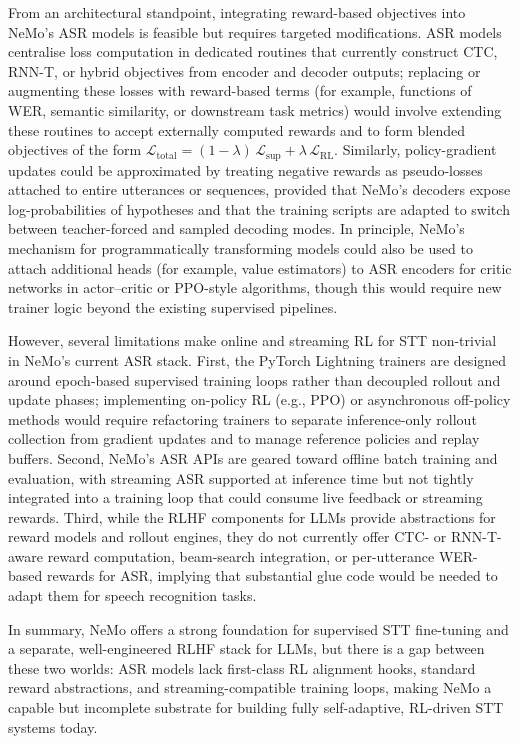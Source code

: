 \documentclass[conference]{IEEEtran}
\begin{document}
From an architectural standpoint, integrating reward-based objectives into NeMo’s ASR models is feasible but requires targeted modifications.
ASR models centralise loss computation in dedicated routines that currently construct CTC, RNN-T, or hybrid objectives from encoder and decoder outputs; replacing or augmenting these losses with reward-based terms (for example, functions of WER, semantic similarity, or downstream task metrics) would involve extending these routines to accept externally computed rewards and to form blended objectives of the form \(\mathcal{L}_{\text{total}} = (1 - \lambda)\,\mathcal{L}_{\text{sup}} + \lambda\,\mathcal{L}_{\text{RL}}\).
Similarly, policy-gradient updates could be approximated by treating negative rewards as pseudo-losses attached to entire utterances or sequences, provided that NeMo’s decoders expose log-probabilities of hypotheses and that the training scripts are adapted to switch between teacher-forced and sampled decoding modes.
In principle, NeMo’s mechanism for programmatically transforming models could also be used to attach additional heads (for example, value estimators) to ASR encoders for critic networks in actor–critic or PPO-style algorithms, though this would require new trainer logic beyond the existing supervised pipelines.

However, several limitations make online and streaming RL for STT non-trivial in NeMo’s current ASR stack.
First, the PyTorch Lightning trainers are designed around epoch-based supervised training loops rather than decoupled rollout and update phases; implementing on-policy RL (e.g., PPO) or asynchronous off-policy methods would require refactoring trainers to separate inference-only rollout collection from gradient updates and to manage reference policies and replay buffers.
Second, NeMo’s ASR APIs are geared toward offline batch training and evaluation, with streaming ASR supported at inference time but not tightly integrated into a training loop that could consume live feedback or streaming rewards.
Third, while the RLHF components for LLMs provide abstractions for reward models and rollout engines, they do not currently offer CTC- or RNN-T-aware reward computation, beam-search integration, or per-utterance WER-based rewards for ASR, implying that substantial glue code would be needed to adapt them for speech recognition tasks.

In summary, NeMo offers a strong foundation for supervised STT fine-tuning and a separate, well-engineered RLHF stack for LLMs, but there is a gap between these two worlds: ASR models lack first-class RL alignment hooks, standard reward abstractions, and streaming-compatible training loops, making NeMo a capable but incomplete substrate for building fully self-adaptive, RL-driven STT systems today.
\end{document}
